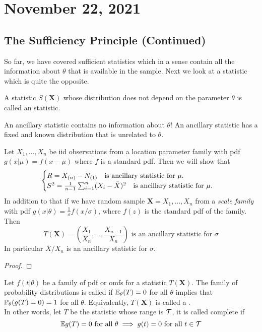 \section{November 22, 2021}
\subsection{The Sufficiency Principle (Continued)}
So far, we have covered sufficient statistics which in a sense contain all the information about $\theta$ that is available in the sample. Next we look at a statistic which is quite the opposite.
\begin{definition}
    A statistic $S(\boldsymbol{X})$ whose distribution does not depend on the parameter
    $\theta$ is called an  statistic.
\end{definition}
An ancillary statistic contains no information about $\theta$! An ancillary statistic has a fixed and known distribution that is unrelated to $\theta.$
\begin{example}
    Let $X_1,...,X_n$ be iid observations from a location parameter family with pdf $g(x|\mu) = f(x-\mu)$ where $f$ is a standard pdf. Then we will show that
    $$
    \begin{cases}
        R = X_{(n)} - N_{(1)} \quad \text{is ancillary statistic for } \mu. \\
        S^2 = \frac{1}{n-1} \sum_{i=1}^{n}(X_i - \Bar{X})^2 \quad \text{is ancillary statistic for } \mu.
    \end{cases}
    $$ 
    In addition to that if we have random sample $\boldsymbol{X} = X_1,...,X_n$ from a \textit{scale family} with pdf $g(x|\theta) = \frac{1}{\sigma}f(x/\sigma)$, where $f(z)$ is the standard pdf of the family. Then
    $$
    T(\boldsymbol{X}) = \left( 
    \frac{X_1}{X_n},...,\frac{X_{n-1}}{X_n} 
    \right)
    \text{ is an ancillary statistic for }\sigma
    $$
    In particular $\bar{X}/X_n$ is an ancillary statistic for $\sigma$.
    \begin{proof}
        
    \end{proof}
\end{example}
\begin{definition}
    Let $f(t|\theta)$ be a family of pdf or omfs for a statistic $T(\boldsymbol{X})$. The family of probability distributions is called  if $\mathbb E_{\theta}(T) = 0$ for all $\theta$ implies that $\mathbb P_{\theta}(g(T) =0) =1$ for all $\theta$. Equivalently, $T(\boldsymbol{X})$ is called a .
    \\
    In other words, let $T$ be the statistic whose range is $\mathcal T$, it is called complete if
    $$
    \mathbb E g(T) = 0 \text{ for all } \theta \implies g(t) =0 \text{ for all } t \in \mathcal T
    $$
\end{definition}